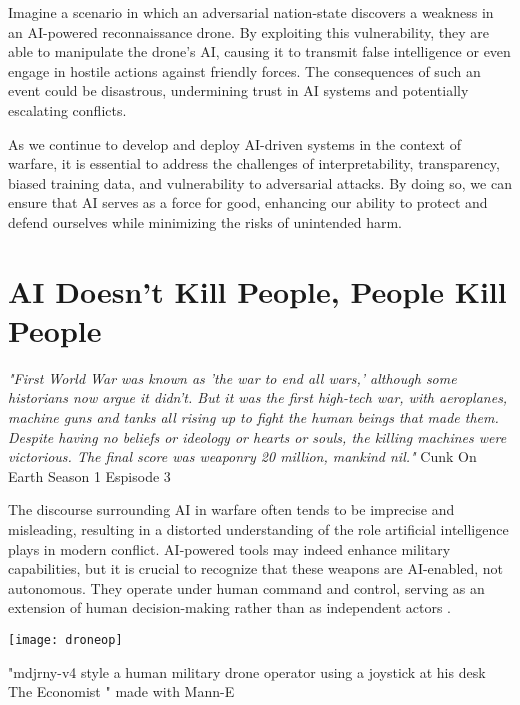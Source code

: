 Imagine a scenario in which an adversarial nation-state discovers a weakness in an AI-powered reconnaissance drone. By exploiting this vulnerability, they are able to manipulate the drone's AI, causing it to transmit false intelligence or even engage in hostile actions against friendly forces. The consequences of such an event could be disastrous, undermining trust in AI systems and potentially escalating conflicts.

As we continue to develop and deploy AI-driven systems in the context of warfare, it is essential to address the challenges of interpretability, transparency, biased training data, and vulnerability to adversarial attacks. By doing so, we can ensure that AI serves as a force for good, enhancing our ability to protect and defend ourselves while minimizing the risks of unintended harm.

\section{AI Doesn't Kill People, People Kill People}

\textit{"First World War was known as 'the war to end all wars,' although some historians now argue it didn't. But it was the first high-tech war, with aeroplanes, machine guns and tanks all rising up to fight the human beings that made them. Despite having no beliefs or ideology or hearts or souls, the killing machines were victorious. The final score was weaponry 20 million, mankind nil."} Cunk On Earth Season 1 Espisode 3 \cite{cunkonearth}

The discourse surrounding AI in warfare often tends to be imprecise and misleading, resulting in a distorted understanding of the role artificial intelligence plays in modern conflict. AI-powered tools may indeed enhance military capabilities, but it is crucial to recognize that these weapons are AI-enabled, not autonomous. They operate under human command and control, serving as an extension of human decision-making rather than as independent actors \cite{aiwarfare}.

\begin{pdf}
\begin{marginfigure}[-5.5cm]
        \texttt{[image: droneop]}
        \caption{"mdjrny-v4 style a human military drone operator using a joystick at his desk The Economist " made with Mann-E}
\end{marginfigure}
\end{pdf}

